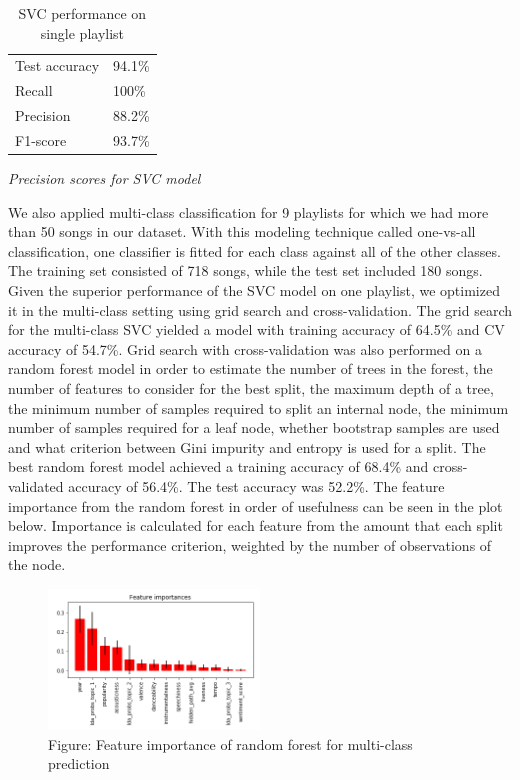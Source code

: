 \documentclass[acmtog]{acmart}
\begin{document}
\begin{table}%
\caption{SVC performance on single playlist}
\label{tab:one}
\begin{minipage}{\columnwidth}
\begin{center}
\begin{tabular}{ll}
  \toprule
  Test accuracy    & 94.1\%\\
  Recall  & 100\%\\
  Precision    & 88.2\%\\
  F1-score    & 93.7\%\\
  \bottomrule
\end{tabular}
\end{center}
\bigskip\centering
\footnotesize
 \emph{Precision scores for SVC model}
\end{minipage}
\end{table}%

We also applied multi-class classification for 9 playlists for which we had more than 50 songs in our dataset. With this modeling technique called one-vs-all classification, one classifier is fitted for each class against all of the other classes. The training set consisted of 718 songs, while the test set included 180 songs. Given the superior performance of the SVC model on one playlist, we optimized it in the multi-class setting using grid search and cross-validation. The grid search for the multi-class SVC yielded a model with training accuracy of 64.5\% and CV accuracy of 54.7\%. Grid search with cross-validation was also performed on a random forest model in order to estimate the number of trees in the forest, the number of features to consider for the best split, the maximum depth of a tree, the minimum number of samples required to split an internal node, the minimum number of samples required for a leaf node, whether bootstrap samples are used and what criterion between Gini impurity and entropy is used for a split. The best random forest model achieved a training accuracy of 68.4\% and cross-validated accuracy of 56.4\%. The test accuracy was 52.2\%. The feature importance from the random forest in order of usefulness can be seen in the plot below. Importance is calculated for each feature from the amount that each split improves the performance criterion, weighted by the number of observations of the node.

\begin{figure}[h]
  \includegraphics[width=0.5\textwidth]{feature_importance2.png}
  \caption{Figure: Feature importance of random forest for multi-class prediction}
  \label{fig:ROC_curve}
\end{figure}
\end{document}
